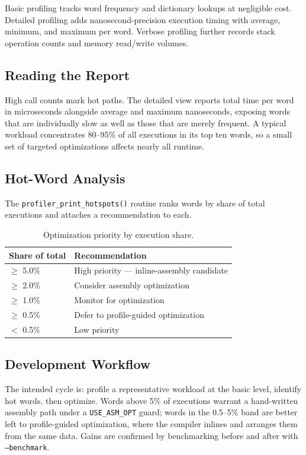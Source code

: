 Basic profiling tracks word frequency and dictionary lookups at negligible
cost. Detailed profiling adds nanosecond-precision execution timing with
average, minimum, and maximum per word. Verbose profiling further records stack
operation counts and memory read/write volumes.

\subsection{Reading the Report}

High call counts mark hot paths. The detailed view reports total time per word
in microseconds alongside average and maximum nanoseconds, exposing words that
are individually slow as well as those that are merely frequent. A typical
workload concentrates 80--95\% of all executions in its top ten words, so a
small set of targeted optimizations affects nearly all runtime.

\subsection{Hot-Word Analysis}

The \texttt{profiler\_print\_hotspots()} routine ranks words by share of total
executions and attaches a recommendation to each.

\begin{table}[h]
\centering
\begin{tabular}{ll}
\toprule
Share of total & Recommendation \\
\midrule
$\geq$ 5.0\% & High priority --- inline-assembly candidate \\
$\geq$ 2.0\% & Consider assembly optimization \\
$\geq$ 1.0\% & Monitor for optimization \\
$\geq$ 0.5\% & Defer to profile-guided optimization \\
$<$ 0.5\% & Low priority \\
\bottomrule
\end{tabular}
\caption{Optimization priority by execution share.}
\end{table}

\subsection{Development Workflow}

The intended cycle is: profile a representative workload at the basic level,
identify hot words, then optimize. Words above 5\% of executions warrant a
hand-written assembly path under a \texttt{USE\_ASM\_OPT} guard; words in the
0.5--5\% band are better left to profile-guided optimization, where the
compiler inlines and arranges them from the same data. Gains are confirmed by
benchmarking before and after with \texttt{--benchmark}.

